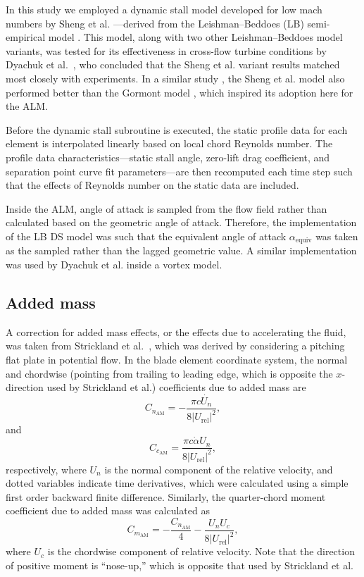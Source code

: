 \documentclass[times]{weauth}
\begin{document}
In this study we employed a dynamic stall model developed for low mach numbers
by Sheng et al. \cite{Sheng2008}---derived from the Leishman--Beddoes (LB)
semi-empirical model \cite{Leishman1989}. This model, along with two other
Leishman--Beddoes model variants, was tested for its effectiveness in cross-flow
turbine conditions by Dyachuk et al.~\cite{Dyachuk2014}, who concluded that the
Sheng et al. variant results matched most closely with experiments. In a similar
study \cite{Dyachuk2015}, the Sheng et al. model also performed better than the
Gormont model \cite{Gormont1973}, which inspired its adoption here for the ALM.

Before the dynamic stall subroutine is executed, the static profile data for
each element is interpolated linearly based on local chord Reynolds number. The
profile data characteristics---static stall angle, zero-lift drag coefficient,
and separation point curve fit parameters---are then recomputed each time step
such that the effects of Reynolds number on the static data are included.

Inside the ALM, angle of attack is sampled from the flow field rather than
calculated based on the geometric angle of attack. Therefore, the implementation
of the LB DS model was such that the equivalent angle of attack
$\alpha_\mathrm{equiv}$ was taken as the sampled rather than the lagged
geometric value. A similar implementation was used by Dyachuk et al.
\cite{Dyachuk2015a} inside a vortex model.


\subsection{Added mass}

A correction for added mass effects, or the effects due to accelerating the
fluid, was taken from Strickland et al.~\cite{Strickland1981}, which was derived
by considering a pitching flat plate in potential flow. In the blade element
coordinate system, the normal and chordwise (pointing from trailing to leading
edge, which is opposite the $x$-direction used by Strickland et al.)
coefficients due to added mass are
\begin{equation}
    C_{n_\mathrm{AM}} = -\frac{\pi c \dot{U_n}}{8 | U_\mathrm{rel} |^2},
\end{equation}
and
\begin{equation}
    C_{c_\mathrm{AM}} = \frac{\pi c \dot{\alpha} U_n }{8 | U_\mathrm{rel} |^2},
\end{equation}
respectively, where $U_n$ is the normal component of the relative velocity, and
dotted variables indicate time derivatives, which were calculated using a simple
first order backward finite difference. Similarly, the quarter-chord moment
coefficient due to added mass was calculated as
\begin{equation}
    C_{m_\mathrm{AM}} = -\frac{C_{n_\mathrm{AM}}}{4}
        - \frac{U_n U_c}{8 | U_\mathrm{rel} |^2},
\end{equation}
where $U_c$ is the chordwise component of relative velocity. Note that the
direction of positive moment is ``nose-up,'' which is opposite that used by
Strickland et al.
\end{document}
